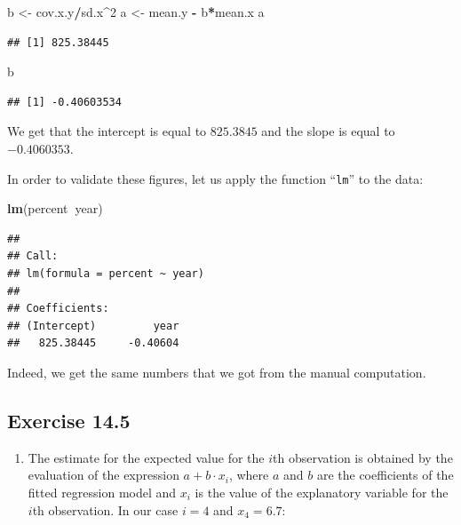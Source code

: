 \documentclass[]{krantz}
\makeatletter
\newenvironment{Shaded}{\begin{snugshade}}{\end{snugshade}}
\newcommand{\DecValTok}[1]{\textcolor[rgb]{0.00,0.00,0.81}{#1}}
\newcommand{\KeywordTok}[1]{\textcolor[rgb]{0.13,0.29,0.53}{\textbf{#1}}}
\newcommand{\NormalTok}[1]{#1}
\newcommand{\OperatorTok}[1]{\textcolor[rgb]{0.81,0.36,0.00}{\textbf{#1}}}
\newcommand{\StringTok}[1]{\textcolor[rgb]{0.31,0.60,0.02}{#1}}
\providecommand{\tightlist}{%
  \setlength{\itemsep}{0pt}\setlength{\parskip}{0pt}}
\newenvironment{kframe}{%
\medskip{}
\setlength{\fboxsep}{.8em}
 \def\at@end@of@kframe{}%
 \ifinner\ifhmode%
  \def\at@end@of@kframe{\end{minipage}}%
  \begin{minipage}{\columnwidth}%
 \fi\fi%
 \def\FrameCommand##1{\hskip\@totalleftmargin \hskip-\fboxsep
 \colorbox{shadecolor}{##1}\hskip-\fboxsep
     \hskip-\linewidth \hskip-\@totalleftmargin \hskip\columnwidth}%
 \MakeFramed {\advance\hsize-\width
   \@totalleftmargin\z@ \linewidth\hsize
   \@setminipage}}%
 {\par\unskip\endMakeFramed%
 \at@end@of@kframe}
\renewenvironment{Shaded}{\begin{kframe}}{\end{kframe}}
\theoremstyle{definition}
\theoremstyle{definition}
\theoremstyle{definition}
\theoremstyle{remark}
\makeatother
\begin{document}
\begin{enumerate}
\begin{Shaded}
\begin{Highlighting}[]
\NormalTok{b <-}\StringTok{ }\NormalTok{cov.x.y}\OperatorTok{/}\NormalTok{sd.x}\OperatorTok{^}\DecValTok{2}
\NormalTok{a <-}\StringTok{ }\NormalTok{mean.y }\OperatorTok{-}\StringTok{ }\NormalTok{b}\OperatorTok{*}\NormalTok{mean.x}
\NormalTok{a}
\end{Highlighting}
\end{Shaded}

\begin{verbatim}
## [1] 825.38445
\end{verbatim}

\begin{Shaded}
\begin{Highlighting}[]
\NormalTok{b}
\end{Highlighting}
\end{Shaded}

\begin{verbatim}
## [1] -0.40603534
\end{verbatim}

  We get that the intercept is equal to \(825.3845\) and the slope is equal
  to \(-0.4060353\).

  In order to validate these figures, let us apply the function ``\texttt{lm}'' to
  the data:

\begin{Shaded}
\begin{Highlighting}[]
\KeywordTok{lm}\NormalTok{(percent}\OperatorTok{~}\NormalTok{year)}
\end{Highlighting}
\end{Shaded}

\begin{verbatim}
## 
## Call:
## lm(formula = percent ~ year)
## 
## Coefficients:
## (Intercept)         year  
##   825.38445     -0.40604
\end{verbatim}

  Indeed, we get the same numbers that we got from the manual computation.
\end{enumerate}

\hypertarget{exercise-14.5}{%
\subsection*{Exercise 14.5}\label{exercise-14.5}}


\begin{enumerate}
\def\labelenumi{\arabic{enumi}.}
\tightlist
\item
  The estimate for the expected
  value for the \(i\)th observation is obtained by the evaluation of the
  expression \(a + b\cdot x_i\), where \(a\) and \(b\) are the coefficients of
  the fitted regression model and \(x_i\) is the value of the explanatory
  variable for the \(i\)th observation. In our case \(i=4\) and \(x_4 = 6.7\):
\end{enumerate}
\end{document}
